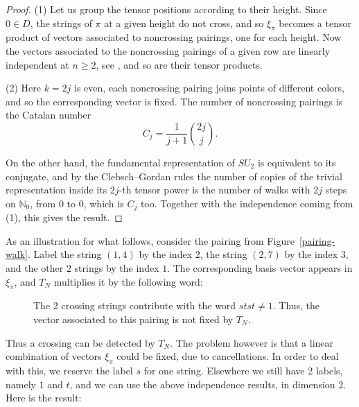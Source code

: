 \documentclass[11pt,a4paper]{article}
\begin{document}
\begin{proof}
(1) Let us group the tensor positions according to their height. Since $0\in D$, the strings of $\pi$ at a given height do not cross, and so $\xi_\pi$ becomes a tensor product of vectors associated to noncrossing pairings, one for each height. Now the vectors associated to the noncrossing pairings of a given row are linearly independent at $n\geq2$, see \cite{bcv}, and so are their tensor products.

(2) Here $k=2j$ is even, each noncrossing pairing joins points of different colors, and so the corresponding vector is fixed. The number of noncrossing pairings is the Catalan number
\[
 C_j=\frac{1}{j+1}\binom{2j}{j}.
\]

On the other hand, the fundamental representation of $SU_2$ is equivalent to its conjugate, and by the Clebsch--Gordan rules the number of copies of the trivial representation inside its $2j$-th tensor power is the number of walks with $2j$ steps on $\mathbb N_0$, from $0$ to $0$, which is $C_j$ too. Together with the independence coming from (1), this gives the result.
\end{proof}

As an illustration for what follows, consider the pairing from Figure~\ref{pairing-walk}. Label the string $(1,4)$ by the index $2$, the string $(2,7)$ by the index $3$, and the other 2 strings by the index $1$. The corresponding basis vector appears in $\xi_\pi$, and $T_N$ multiplies it by the following word:

\begin{figure}[H]\centering
{}
\caption{The 2 crossing strings contribute with the word $stst\neq1$. Thus, the vector associated to this pairing is not fixed by $T_N$.}
\end{figure}

Thus a crossing can be detected by $T_N$. The problem however is that a linear combination of vectors $\xi_\pi$ could be fixed, due to cancellations. In order to deal with this, we reserve the label $s$ for one string. Elsewhere we still have 2 labels, namely $1$ and $t$, and we can use the above independence results, in dimension 2. Here is the result:
\end{document}

